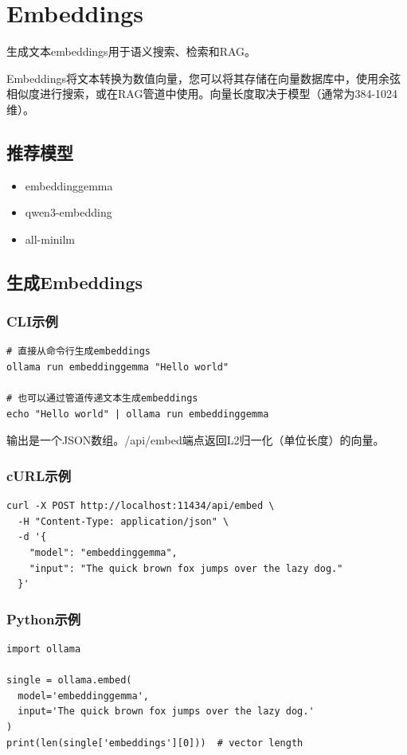 \documentclass[12pt,UTF8]{ctexbook}
\begin{document}
\section{Embeddings}

生成文本embeddings用于语义搜索、检索和RAG。

Embeddings将文本转换为数值向量，您可以将其存储在向量数据库中，使用余弦相似度进行搜索，或在RAG管道中使用。向量长度取决于模型（通常为384-1024维）。

\subsection{推荐模型}

\begin{itemize}
  \item embeddinggemma
  \item qwen3-embedding
  \item all-minilm
\end{itemize}

\subsection{生成Embeddings}

\subsubsection{CLI示例}
\begin{verbatim}
# 直接从命令行生成embeddings
ollama run embeddinggemma "Hello world"

# 也可以通过管道传递文本生成embeddings
echo "Hello world" | ollama run embeddinggemma
\end{verbatim}

输出是一个JSON数组。/api/embed端点返回L2归一化（单位长度）的向量。

\subsubsection{cURL示例}
\begin{verbatim}
curl -X POST http://localhost:11434/api/embed \
  -H "Content-Type: application/json" \
  -d '{
    "model": "embeddinggemma",
    "input": "The quick brown fox jumps over the lazy dog."
  }'
\end{verbatim}

\subsubsection{Python示例}
\begin{verbatim}
import ollama

single = ollama.embed(
  model='embeddinggemma',
  input='The quick brown fox jumps over the lazy dog.'
)
print(len(single['embeddings'][0]))  # vector length
\end{verbatim}
\end{document}
